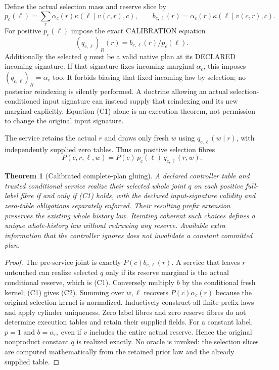 \documentclass{article}
\newtheorem{theorem}{Theorem}\newtheorem{proposition}{Proposition}
\begin{document}
Define the actual selection mass and reserve slice by
\[
 p_c(\ell)=\sum_r\alpha_c(r)\kappa(\ell\mid v(c,r),c),\qquad
 b_{c,\ell}(r)=\alpha_c(r)\kappa(\ell\mid v(c,r),c).
\]
For positive $p_c(\ell)$ impose the exact CALIBRATION equation
\[
 (q_{c,\ell})_R(r)=b_{c,\ell}(r)/p_c(\ell).\tag{C1}
\]
Additionally the selected $q$ must be a valid native plan at its DECLARED incoming signature. If that signature fixes incoming marginal $\alpha_c$, this imposes $(q_{c,\ell})_R=\alpha_c$ too. It forbids biasing that fixed incoming law by selection; no posterior reindexing is silently performed. A doctrine allowing an actual selection-conditioned input signature can instead supply that reindexing and its new marginal explicitly. Equation (C1) alone is an execution theorem, not permission to change the original input signature.

The service retains the actual $r$ and draws only fresh $w$ using $q_{c,\ell}(w\mid r)$, with independently supplied zero tables. Thus on positive selection fibres
\[
 P(c,r,\ell,w)=P(c)\,p_c(\ell)\,q_{c,\ell}(r,w).\tag{C2}
\]
\begin{theorem}[Calibrated complete-plan gluing]
A declared controller table and trusted conditional service realize their selected whole joint $q$ on each positive full-label fibre if and only if (C1) holds, with the declared input-signature validity and zero-table obligations separately enforced. Their resulting prefix extension preserves the existing whole history law. Iterating coherent such choices defines a unique whole-history law without redrawing any reserve. Available extra information that the controller ignores does not invalidate a constant committed plan.
\end{theorem}
\begin{proof}
The pre-service joint is exactly $P(c)b_{c,\ell}(r)$. A service that leaves $r$ untouched can realize selected $q$ only if its reserve marginal is the actual conditional reserve, which is (C1). Conversely multiply $b$ by the conditional fresh kernel; (C1) gives (C2). Summing over $w,\ell$ recovers $P(c)\alpha_c(r)$ because the original selection kernel is normalized. Inductively construct all finite prefix laws and apply cylinder uniqueness. Zero label fibres and zero reserve fibres do not determine execution tables and retain their supplied fields. For a constant label, $p=1$ and $b=\alpha_c$, even if $v$ includes the entire actual reserve. Hence the original nonproduct constant $q$ is realized exactly. No oracle is invoked: the selection slices are computed mathematically from the retained prior law and the already supplied table.
\end{proof}
\end{document}

